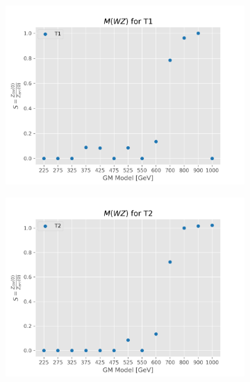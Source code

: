 \documentclass[../Bachelorarbeit.tex]{subfiles}
\begin{document}
\begin{figure}[h]
\begin{subfigure}{0.45\textwidth}
    \end{subfigure}
    \begin{subfigure}{0.45\textwidth}
        \includegraphics[width=\textwidth]{Plots/gm_relevanze/MWZ_op_T1.png}

    \end{subfigure}
    \begin{subfigure}{0.45\textwidth}
        \includegraphics[width=\textwidth]{Plots/gm_relevanze/MWZ_op_T2.png}

    \end{subfigure}

\end{figure}
\end{document}
